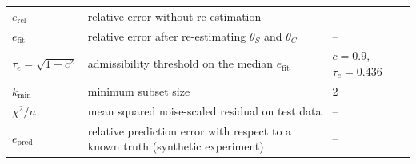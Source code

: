 \documentclass[11pt]{article}
\theoremstyle{definition}
\theoremstyle{plain}
\theoremstyle{remark}
\begin{document}
\begin{longtable}{@{}p{5.2cm}p{7.6cm}p{3.2cm}@{}}
$e_{\mathrm{rel}}$ & relative error without re-estimation & -- \\
$e_{\mathrm{fit}}$ & relative error after re-estimating $\theta_S$ and $\theta_C$ & -- \\
$\tau_e=\sqrt{1-c^2}$ & admissibility threshold on the median $e_{\mathrm{fit}}$ & $c=0.9$, $\tau_e=0.436$ \\
$k_{\min}$ & minimum subset size & 2 \\
$\chi^2/n$ & mean squared noise-scaled residual on test data & -- \\
$e_{\mathrm{pred}}$ & relative prediction error with respect to a known truth (synthetic experiment) & -- \\
\bottomrule
\end{longtable}

{\small

}















































\clearpage

\end{document}
